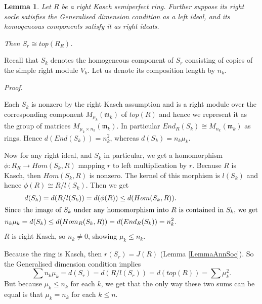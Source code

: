 \documentclass[11pt]{article}
\theoremstyle{plain}
\newtheorem{Lemma}[veta]{Lemma}
\theoremstyle{remark}
\theoremstyle{plain}
\newenvironment{Proof}{
  \par\medskip\noindent
  \textit{Proof}.
}{
\newline
\rightline{$\qedsymbol$}
}
\newcommand{\m}{\mathfrak{m}}
\begin{document}
\begin{Lemma} \label{LemmaHon}Let $R$ be a right Kasch semiperfect ring. Further suppose its right socle satisfies the Generalised dimension condition as a left ideal, and its homogeneous components satisfy it as right ideals. 

    Then $S_r\cong top(R_R)$.
\end{Lemma}
Recall that $S_k$ denotes the homogeneous component of $S_r$ consisting of copies of the simple right module $V_k$. Let us denote its composition length by $n_k$.
\begin{Proof}
     Each $S_k$ is nonzero by the right Kasch assumption and is a right module over the corresponding component $M_{\mu_k}(\m_k)$ of $top(R)$ and hence we represent it as the group of matrices $M_{\mu_k\times n_k}(\m_k)$. In particular $End_R(S_k)\cong M_{n_k}(\m_k)$ as rings. Hence $d(End(S_k))=n_k^2$, whereas $d(S_k)=n_k \mu_{k}$. 

    
    Now for any right ideal, and $S_k$ in particular, we get a homomorphism $\phi\colon R_R\to Hom(S_k, R)$ mapping $r$ to left multiplication by $r$. Because $R$ is Kasch, then $Hom(S_k, R)$ is nonzero. The kernel of this morphism is $l(S_k)$ and hence $\phi(R)\cong R/l(S_k)$. Then we get 
    \begin{align*}
    d(S_k)=d(R/l(S_k))=d(\phi(R))\leq d(Hom(S_k, R)). \\
\intertext{Since the image of $S_k$ under any homomorphism into $R$ is contained in  $S_k$, we get}
        n_k\mu_k= d(S_k)\leq d(Hom_R(S_k, R)) =d(End_R(S_k)) =n_k^
    2.
\end{align*}
$R$ is right Kasch, so $n_k\neq 0$, showing $\mu_k\leq n_k$.

    Because the ring is Kasch, then $r(S_r)=J(R)$ (Lemma \ref{LemmaAnnSoc}). So the Generalised dimension condition implies  \[\sum n_k\mu_k=d(S_r)=d(R/l(S_r))=d(top(R))=\sum \mu_k^2. \] But because $\mu_k \leq n_k$ for each $k$, we get that the only way these two sums can be equal is that  $\mu_k=n_k$ for each $k\leq n$.
\end{Proof}
\end{document}
